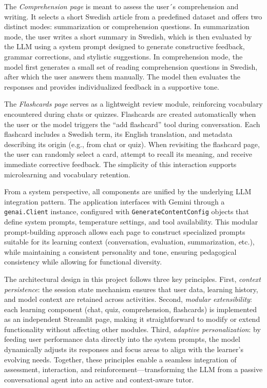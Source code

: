 \documentclass[a4paper,10pt]{article}
\begin{document}
The \textit{Comprehension page} is meant to assess the user´s comprehension and writing. It selects a short Swedish article from a predefined dataset and offers two distinct modes: summarization or comprehension questions. In summarization mode, the user writes a short summary in Swedish, which is then evaluated by the LLM using a system prompt designed to generate constructive feedback, grammar corrections, and stylistic suggestions. In comprehension mode, the model first generates a small set of reading comprehension questions in Swedish, after which the user answers them manually. The model then evaluates the responses and provides individualized feedback in a supportive tone. 

The \textit{Flashcards page} serves as a lightweight review module, reinforcing vocabulary encountered during chats or quizzes. Flashcards are created automatically when the user or the model triggers the “add flashcard” tool during conversation. Each flashcard includes a Swedish term, its English translation, and metadata describing its origin (e.g., from chat or quiz). When revisiting the flashcard page, the user can randomly select a card, attempt to recall its meaning, and receive immediate corrective feedback. The simplicity of this interaction supports microlearning and vocabulary retention.

From a system perspective, all components are unified by the underlying LLM integration pattern. The application interfaces with Gemini through a \texttt{genai.Client} instance, configured with \texttt{GenerateContentConfig} objects that define system prompts, temperature settings, and tool availability. This modular prompt-building approach allows each page to construct specialized prompts suitable for its learning context (conversation, evaluation, summarization, etc.), while maintaining a consistent personality and tone, ensuring pedagogical consistency while allowing for functional diversity.

The architectural design  in this project follows three key principles. First, \textit{context persistence}: the session state mechanism ensures that user data, learning history, and model context are retained across activities. Second, \textit{modular extensibility}: each learning component (chat, quiz, comprehension, flashcards) is implemented as an independent Streamlit page, making it straightforward to modify or extend functionality without affecting other modules. Third, \textit{adaptive personalization}: by feeding user performance data directly into the system prompts, the model dynamically adjusts its responses and focus areas to align with the learner’s evolving needs. Together, these principles enable a seamless integration of assessment, interaction, and reinforcement—transforming the LLM from a passive conversational agent into an active and context-aware tutor.
\end{document}
